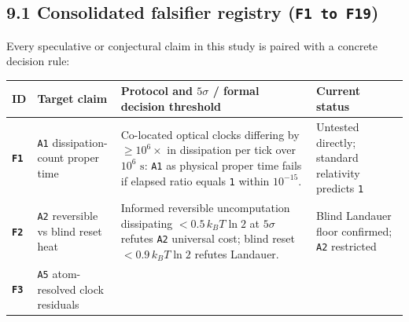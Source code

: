 \documentclass[10pt,letterpaper]{article}
\newcounter{none}
\begin{document}
\subsection{\texorpdfstring{9.1 Consolidated falsifier registry
(\texttt{F1\ to\ F19})}{9.1 Consolidated falsifier registry (F1 to F19)}}\label{consolidated-falsifier-registry-f1-to-f19}

Every speculative or conjectural claim in this study is paired with a
concrete decision rule:

{\def\LTcaptype{none} %
{\footnotesize\setlength{\tabcolsep}{3.8pt}\renewcommand{\arraystretch}{1.15}
\begin{longtable}[]{@{}
  >{\raggedright\arraybackslash}p{}
  >{\raggedright\arraybackslash}p{}
  >{\raggedright\arraybackslash}p{}
  >{\raggedright\arraybackslash}p{}@{}}
\toprule\noalign{}
\begin{minipage}[b]{\linewidth}\raggedright
\textbf{ID}
\end{minipage} & \begin{minipage}[b]{\linewidth}\raggedright
\textbf{Target claim}
\end{minipage} & \begin{minipage}[b]{\linewidth}\raggedright
\textbf{Protocol and \(5\sigma\) / formal decision threshold}
\end{minipage} & \begin{minipage}[b]{\linewidth}\raggedright
\textbf{Current status}
\end{minipage} \\
\midrule\noalign{}
\endhead
\bottomrule\noalign{}
\endlastfoot
\textbf{\texttt{F1}} & \texttt{A1} dissipation-count proper time &
Co-located optical clocks differing by \(\ge 10^6\times\) in dissipation
per tick over \(10^6\text{ s}\): \texttt{A1} as physical proper time
fails if elapsed ratio equals \texttt{1} within \(10^{-15}\). & Untested
directly; standard relativity predicts \texttt{1} \\
\textbf{\texttt{F2}} & \texttt{A2} reversible vs blind reset heat &
Informed reversible uncomputation dissipating \(< 0.5\,k_B T \ln 2\) at
\(5\sigma\) refutes \texttt{A2} universal cost; blind reset
\(< 0.9\,k_B T \ln 2\) refutes Landauer. & Blind Landauer floor
confirmed; \texttt{A2} restricted \\
\textbf{\texttt{F3}} & \texttt{A5} atom-resolved clock residuals &

\end{longtable}}}
\end{document}
